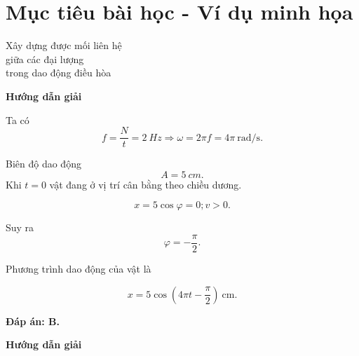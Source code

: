 \section{Mục tiêu bài học - Ví dụ minh họa}
\begin{dang}{Xây dựng được mối liên hệ\\ giữa các đại lượng\\ trong dao động điều hòa}
	{\begin{center}
			\textbf{Hướng dẫn giải}
		\end{center}
		
		Ta có
		\begin{equation*}
			f = \dfrac{N}{t} = \SI{2}{Hz} \Rightarrow \omega =2\pi f = 4\pi\ \text{rad/s}.
		\end{equation*}
		
		Biên độ dao động
		\begin{equation*}
			A = \SI{5}{cm}.
		\end{equation*}
		Khi $t=0$ vật đang ở vị trí cân bằng theo chiều dương.
		
		\begin{equation*}
			x=5\cos \varphi =0; v>0.
		\end{equation*}
		
		Suy ra
		\begin{equation*}
			\varphi = - \dfrac{\pi}{2}.
		\end{equation*}
		
		Phương trình dao động của vật là
		
		\begin{equation*}
			x=5\cos \left(4\pi t - \dfrac{\pi}{2}\right)\ \text{cm}.
		\end{equation*}
		
		\textbf{Đáp án: B.}
	}
	{\begin{center}
			\textbf{Hướng dẫn giải}
		\end{center}
		
}
\end{dang}
